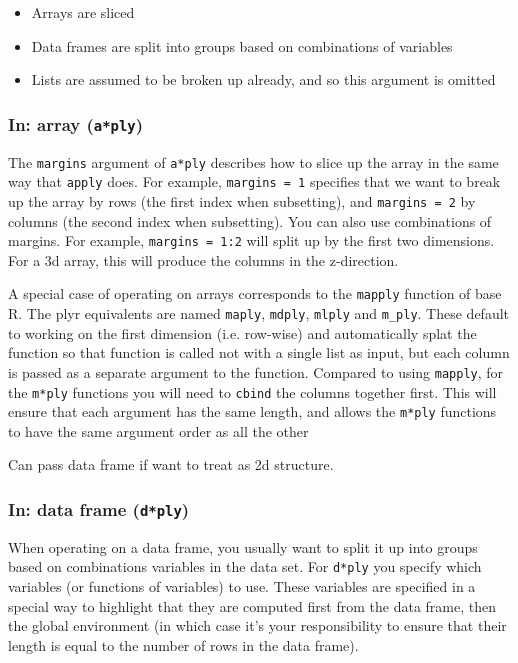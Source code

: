 \documentclass[letterpaper,oneside]{scrartcl}
\begin{document}
\begin{itemize}
  \item Arrays are sliced 
  
  \item Data frames are split into groups based on combinations of variables
  
  \item Lists are assumed to be broken up already, and so this argument is omitted
  
\end{itemize}

\subsubsection{In: array ({\tt a*ply})}

The {\tt margins} argument of {\tt a*ply} describes how to slice up the array in the same way that {\tt apply} does.  For example, {\tt margins = 1} specifies that we want to break up the array by rows (the first index when subsetting), and {\tt margins = 2} by columns (the second index when subsetting).  You can also use combinations of margins.  For example, {\tt margins = 1:2} will split up by the first two dimensions.  For a 3d array, this will produce the columns in the z-direction.

A special case of operating on arrays corresponds to the {\tt mapply} function of base R.  The plyr equivalents are named {\tt maply}, {\tt mdply}, {\tt mlply} and {\tt m\_ply}.  These default to working on the first dimension (i.e. row-wise) and automatically splat the function so that function is called not with a single list as input, but each column is passed as a separate argument to the function.  Compared to using {\tt mapply}, for the {\tt m*ply} functions you will need to {\tt cbind} the columns together first.  This will ensure that each argument has the same length, and allows the {\tt m*ply} functions to have the same argument order as all the other 

Can pass data frame if want to treat as 2d structure.  

\subsubsection{In: data frame ({\tt d*ply})}

When operating on a data frame, you usually want to split it up into groups based on combinations variables in the data set.  For {\tt d*ply} you specify   which variables (or functions of variables) to use.  These variables are specified in a special way to highlight that they are computed first from the data frame, then the global environment (in which case it's your responsibility to ensure that their length is equal to the number of rows in the data frame).  
\end{document}

